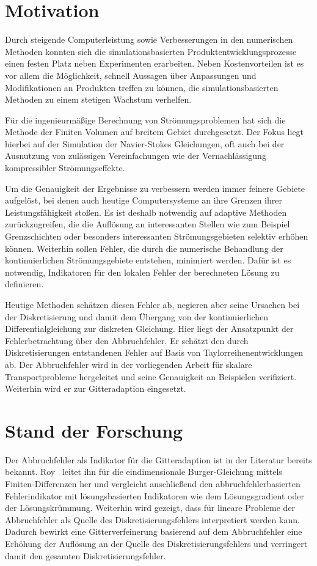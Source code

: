 \section{Motivation}
Durch steigende Computerleistung sowie Verbesserungen in den numerischen Methoden konnten
sich die simulationsbasierten Produktentwicklungsprozesse einen festen Platz neben
Experimenten erarbeiten. Neben Kostenvorteilen ist es vor allem die Möglichkeit,
schnell Aussagen über Anpassungen und Modifikationen an Produkten treffen zu können, die
simulationsbasierten Methoden zu einem stetigen Wachstum verhelfen.

Für die ingenieurmäßige Berechnung von Strömungsproblemen hat sich die Methode der
Finiten Volumen auf breitem Gebiet durchgesetzt. Der Fokus liegt hierbei auf der Simulation
der Navier-Stokes Gleichungen, oft auch bei der Ausnutzung von zulässigen Vereinfachungen
wie der Vernachlässigung kompressibler Strömungseffekte.

Um die Genauigkeit der Ergebnisse zu verbessern werden immer feinere Gebiete aufgelöst,
bei denen auch heutige Computersysteme an ihre Grenzen ihrer Leistungsfähigkeit stoßen. Es ist deshalb notwendig
auf adaptive Methoden zurückzugreifen, die die Auflösung an interessanten Stellen wie
zum Beispiel Grenzschichten oder besonders interessanten Strömungsgebieten selektiv erhöhen können.
Weiterhin sollen Fehler, die durch die numerische Behandlung der kontinuierlichen Strömungsgebiete
entstehen, minimiert werden. Dafür ist es notwendig, Indikatoren für den lokalen Fehler
der berechneten Lösung zu definieren.

Heutige Methoden schätzen diesen Fehler ab, negieren aber seine Ursachen bei der Diskretisierung
und damit dem Übergang von der kontinuierlichen Differentialgleichung zur diskreten Gleichung.
Hier liegt der Ansatzpunkt der Fehlerbetrachtung über den Abbruchfehler. Er schätzt
den durch Diskretisierungen entstandenen Fehler auf Basis von Taylorreihenentwicklungen ab.
Der Abbruchfehler wird in der
vorliegenden Arbeit für skalare Transportprobleme hergeleitet und seine Genauigkeit an Beispielen
verifiziert. Weiterhin wird er zur Gitteradaption eingesetzt.


\section{Stand der Forschung}

Der Abbruchfehler als Indikator für die Gitteradaption ist in der Literatur bereits bekannt.
Roy~\cite{roy2} leitet ihn für die eindimensionale Burger-Gleichung mittels
Finiten-Differenzen her und vergleicht anschließend den abbruchfehlerbasierten Fehlerindikator
mit lösungsbasierten Indikatoren wie dem Lösungsgradient oder der Lösungskrümmung. Weiterhin wird gezeigt,
dass für lineare Probleme der Abbruchfehler
als Quelle des Diskretisierungsfehlers interpretiert werden kann.
Dadurch bewirkt eine Gitterverfeinerung basierend auf dem Abbruchfehler
eine Erhöhung der Auflösung an der Quelle des Diskretisierungsfehlers und
verringert damit den gesamten Diskretisierungsfehler.

